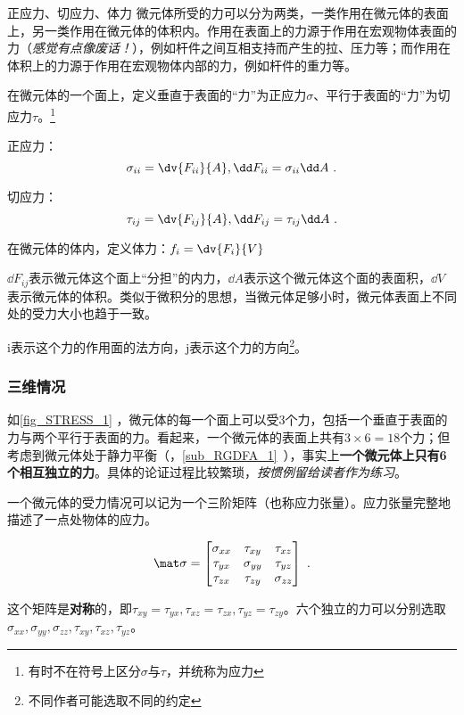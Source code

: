 \begin{definition}{正应力、切应力、体力}
微元体所受的力可以分为两类，一类作用在微元体的表面上，另一类作用在微元体的体积内。作用在表面上的力源于作用在宏观物体表面的力（\textsl{感觉有点像废话！}），例如杆件之间互相支持而产生的拉、压力等；而作用在体积上的力源于作用在宏观物体内部的力，例如杆件的重力等。

在微元体的一个面上，定义垂直于表面的“力”为正应力$\sigma$、平行于表面的“力”为切应力$\tau$。\footnote{有时不在符号上区分$\sigma$与$\tau$，并统称为应力}

正应力：$$\sigma_{ii} =\dv{F_{ii}}{A}, \dd F_{ii} = \sigma_{ii} \dd A~.$$

切应力：$$\tau_{ij}=\dv{F_{ij}}{A}, \dd F_{ij} = \tau_{ij} \dd A~.$$

在微元体的体内，定义体力：$f_i = \dv{F_i}{V}$

$\dd F_{ij}$表示微元体这个面上“分担”的内力，$\dd A$表示这个微元体这个面的表面积，$\dd V$表示微元体的体积。类似于微积分的思想，当微元体足够小时，微元体表面上不同处的受力大小也趋于一致。

i表示这个力的作用面的法方向，j表示这个力的方向\footnote{不同作者可能选取不同的约定}。
\end{definition}

\subsubsection{三维情况}
如\autoref{fig_STRESS_1} ，微元体的每一个面上可以受$3$个力，包括一个垂直于表面的力与两个平行于表面的力。看起来，一个微元体的表面上共有$3\times6=18$个力；但考虑到微元体处于静力平衡（，\autoref{sub_RGDFA_1}~），事实上\textbf{一个微元体上只有6个相互独立的力}。具体的论证过程比较繁琐，\textsl{按惯例留给读者作为练习}。

一个微元体的受力情况可以记为一个三阶矩阵（也称应力张量）。应力张量完整地描述了一点处物体的应力。

\begin{equation}
\mat \sigma=
\begin{bmatrix}
\sigma_{xx} & \tau_{xy} & \tau_{xz} \\
\tau_{yx} & \sigma_{yy} & \tau_{yz} \\
\tau_{zx} & \tau_{zy} & \sigma_{zz} \\
\end{bmatrix}~.
\end{equation}

这个矩阵是\textbf{对称}的，即$\tau_{xy} = \tau_{yx}, \tau_{xz}=\tau_{zx}, \tau_{yz}=\tau_{zy}$。六个独立的力可以分别选取 $\sigma_{xx}, \sigma_{yy},\sigma_{zz}, \tau_{xy}, \tau_{xz},  \tau_{yz}$。

